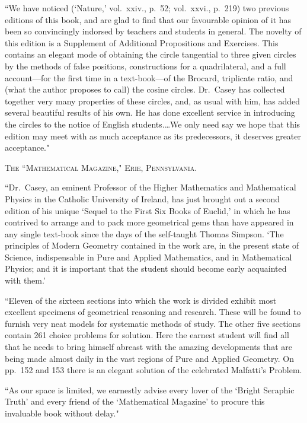 \documentclass[oneside]{book}
\begin{document}
\begin{footnotesize}
``We have noticed (`Nature,' vol.~xxiv., p.~52; vol.~xxvi.,
p.~219) two previous editions of this book, and are glad to find
that our favourable opinion of it has been so convincingly indorsed
by teachers and students in general. The novelty of this
edition is a Supplement of Additional Propositions and Exercises.
This contains an elegant mode of obtaining the circle tangential
to three given circles by the methods of false positions, constructions
for a quadrilateral, and a full account---for the first time in
a text-book---of the Brocard, triplicate ratio, and (what the author
proposes to call) the cosine circles. Dr.~Casey has collected together
very many properties of these circles, and, as usual with
him, has added several beautiful results of his own. He has
done excellent service in introducing the circles to the notice of
English students.\ldots We only need say we hope that this
edition may meet with as much acceptance as its predecessors,
it deserves greater acceptance."
\end{footnotesize}


\bigskip
\begin{center}
\textsc{The ``Mathematical Magazine," Erie, Pennsylvania.}
\end{center}
\nopagebreak

\begin{footnotesize}
``Dr.~Casey, an eminent Professor of the Higher Mathematics
and Mathematical Physics in the Catholic University of Ireland,
has just brought out a second edition of his unique `Sequel to
the First Six Books of Euclid,' in which he has contrived to
arrange and to pack more geometrical gems than have appeared
in any single text-book since the days of the self-taught Thomas
Simpson. `The principles of Modern Geometry contained in the
work are, in the present state of Science, indispensable in Pure
and Applied Mathematics, and in Mathematical Physics; and it
is important that the student should become early acquainted
with them.'

``Eleven of the sixteen sections into which the work is divided
exhibit most excellent specimens of geometrical reasoning and
research. These will be found to furnish very neat models for
systematic methods of study. The other five sections contain
261 choice problems for solution. Here the earnest student will
find all that he needs to bring himself abreast with the amazing
developments that are being made almost daily in the vast regions
of Pure and Applied Geometry. On pp.~152 and 153 there is an
elegant solution of the celebrated Malfatti's Problem.

``As our space is limited, we earnestly advise every lover of
the `Bright Seraphic Truth' and every friend of the `Mathematical
Magazine' to procure this invaluable book without
delay."
\end{footnotesize}
\end{document}
